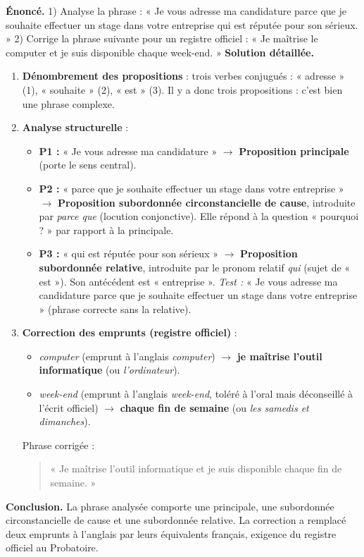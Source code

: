 \documentclass[11pt]{article}
\begin{document}
\begin{exoresolu}
\textbf{Énoncé.} 1) Analyse la phrase : « Je vous adresse ma candidature parce que je souhaite effectuer un stage dans votre entreprise qui est réputée pour son sérieux. » 2) Corrige la phrase suivante pour un registre officiel : « Je maîtrise le computer et je suis disponible chaque week-end. »
\tcblower
\textbf{Solution détaillée.}
\begin{enumerate}
\item \textbf{Dénombrement des propositions} : trois verbes conjugués : « adresse » (1), « souhaite » (2), « est » (3). Il y a donc trois propositions : c'est bien une phrase complexe.
\item \textbf{Analyse structurelle} :
\begin{itemize}
\item \textbf{P1 :} « Je vous adresse ma candidature » $\rightarrow$ \textbf{Proposition principale} (porte le sens central).
\item \textbf{P2 :} « parce que je souhaite effectuer un stage dans votre entreprise » $\rightarrow$ \textbf{Proposition subordonnée circonstancielle de cause}, introduite par \emph{parce que} (locution conjonctive). Elle répond à la question « pourquoi ? » par rapport à la principale.
\item \textbf{P3 :} « qui est réputée pour son sérieux » $\rightarrow$ \textbf{Proposition subordonnée relative}, introduite par le pronom relatif \emph{qui} (sujet de « est »). Son antécédent est « entreprise ». \textit{Test :} « Je vous adresse ma candidature parce que je souhaite effectuer un stage dans votre entreprise » (phrase correcte sans la relative).
\end{itemize}
\item \textbf{Correction des emprunts (registre officiel)} :
\begin{itemize}
\item \emph{computer} (emprunt à l'anglais \textit{computer}) $\rightarrow$ \textbf{je maîtrise l'outil informatique} (ou \emph{l'ordinateur}).
\item \emph{week-end} (emprunt à l'anglais \textit{week-end}, toléré à l'oral mais déconseillé à l'écrit officiel) $\rightarrow$ \textbf{chaque fin de semaine} (ou \emph{les samedis et dimanches}).
\end{itemize}
Phrase corrigée :
\begin{quote}
« Je maîtrise l'outil informatique et je suis disponible chaque fin de semaine. »
\end{quote}
\end{enumerate}
\textbf{Conclusion.} La phrase analysée comporte une principale, une subordonnée circonstancielle de cause et une subordonnée relative. La correction a remplacé deux emprunts à l'anglais par leurs équivalents français, exigence du registre officiel au Probatoire.
\end{exoresolu}
\end{document}
